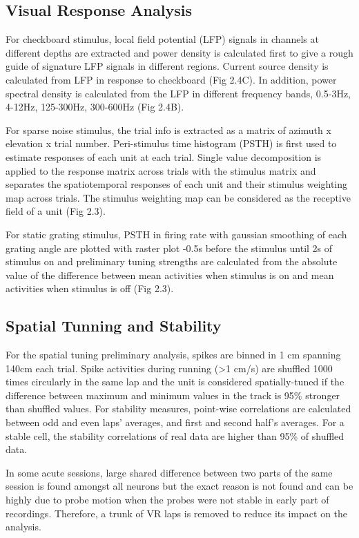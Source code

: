 \subsection{Visual Response Analysis}
For checkboard stimulus, local field potential (LFP) signals in channels at different depths are extracted and power density is calculated first to give a rough guide of signature LFP signals in different regions. Current source density is calculated from LFP in response to checkboard (Fig 2.4C). In addition, power spectral density is calculated from the LFP in different frequency bands, 0.5-3Hz, 4-12Hz, 125-300Hz, 300-600Hz (Fig 2.4B).

 For sparse noise stimulus, the trial info is extracted as a matrix of azimuth x elevation x trial number. Peri-stimulus time histogram (PSTH) is first used to estimate responses of each unit at each trial. Single value decomposition is applied to the response matrix across trials with the stimulus matrix and separates the spatiotemporal responses of each unit and their stimulus weighting map across trials. The stimulus weighting map can be considered as the receptive field of a unit (Fig 2.3).

 For static grating stimulus, PSTH in firing rate with gaussian smoothing of each grating angle are plotted with raster plot -0.5s before the stimulus until 2s of stimulus on and preliminary tuning strengths are calculated from the absolute value of the difference between mean activities when stimulus is on and mean activities when stimulus is off (Fig 2.3).


\subsection{Spatial Tunning and Stability}
For the spatial tuning preliminary analysis, spikes are binned in 1 cm spanning 140cm each trial. Spike activities during running (>1 cm/s) are shuffled 1000 times circularly in the same lap and the unit is considered spatially-tuned if the difference between maximum and minimum values in the track is 95\% stronger than shuffled values. For stability measures, point-wise correlations are calculated between odd and even laps' averages, and first and second half's averages. For a stable cell, the stability correlations of real data are higher than 95\% of shuffled data. 

In some acute sessions, large shared difference between two parts of the same session is found amongst all neurons but the exact reason is not found and can be highly due to probe motion when the probes were not stable in early part of recordings. Therefore, a trunk of VR laps is removed to reduce its impact on the analysis.


